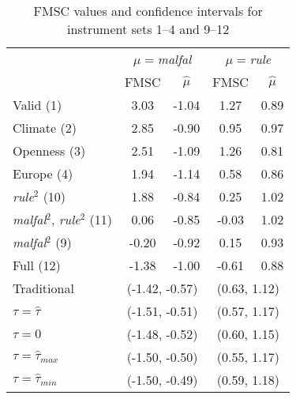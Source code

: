 \begin{table}[htbp]
\caption{FMSC values and confidence intervals for instrument sets 1--4 and 9--12}
\label{tab:all}
\small
\centering
 \begin{tabular}{lcccc}\hline\hline
 & \multicolumn{2}{c}{$\mu=$\emph{malfal}}& \multicolumn{2}{c}{$\mu=$\emph{rule}}\\
&\multicolumn{1}{c}{FMSC}&\multicolumn{1}{c}{$\widehat{\mu}$}&\multicolumn{1}{c}{FMSC}&\multicolumn{1}{c}{$\widehat{\mu}$}\tabularnewline
\hline
Valid (1)& 3.03&-1.04& 1.27&0.89\tabularnewline
Climate (2)& 2.85&-0.90& 0.95&0.97\tabularnewline
Openness (3)& 2.51&-1.09& 1.26&0.81\tabularnewline
Europe (4)& 1.94&-1.14& 0.58&0.86\tabularnewline
\emph{rule}$^2$ (10)& 1.88&-0.84& 0.25&1.02\tabularnewline
\emph{malfal}$^2$, \emph{rule}$^2$ (11)& 0.06&-0.85&-0.03&1.02\tabularnewline
\emph{malfal}$^2$ (9)&-0.20&-0.92& 0.15&0.93\tabularnewline
Full (12)&-1.38&-1.00&-0.61&0.88\tabularnewline
\hline
Traditional&\multicolumn{2}{c}{(-1.42, -0.57)}&\multicolumn{2}{c}{(0.63, 1.12)}\\
$\tau = \widehat{\tau}$&\multicolumn{2}{c}{(-1.51, -0.51)}&\multicolumn{2}{c}{(0.57, 1.17)}\\
$\tau = 0$&\multicolumn{2}{c}{(-1.48, -0.52)}&\multicolumn{2}{c}{(0.60, 1.15)}\\
$\tau = \widehat{\tau}_{max}$&\multicolumn{2}{c}{(-1.50, -0.50)}&\multicolumn{2}{c}{(0.55, 1.17)}\\
$\tau = \widehat{\tau}_{min}$&\multicolumn{2}{c}{(-1.50, -0.49)}&\multicolumn{2}{c}{(0.59, 1.18)}\\
\hline
\end{tabular}


\footnotesize
\end{table}